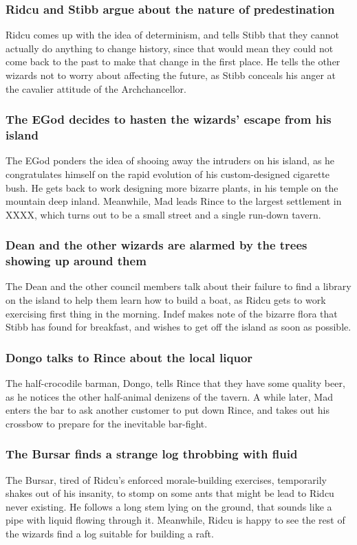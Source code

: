 \subsubsection{\Gls{Ridcu} and \Gls{Stibb} argue about the nature of predestination}
\Gls{Ridcu} comes up with the idea of determinism, and tells \Gls{Stibb} that they cannot actually
do anything to change history, since that would mean they could not come back to the past to make
that change in the first place. He tells the other wizards not to worry about affecting the future,
as \Gls{Stibb} conceals his anger at the cavalier attitude of the Archchancellor.

\subsubsection{The \Gls{EGod} decides to hasten the wizards' escape from his island}
The \Gls{EGod} ponders the idea of shooing away the intruders on his island, as he congratulates
himself on the rapid evolution of his custom-designed cigarette bush. He gets back to work
designing more bizarre plants, in his temple on the mountain deep inland. Meanwhile, \Gls{Mad} leads
\Gls{Rince} to the largest settlement in XXXX, which turns out to be a small street and a single
run-down tavern.

\subsubsection{\Gls{Dean} and the other wizards are alarmed by the trees showing up around them}
The \Gls{Dean} and the other council members talk about their failure to find a library on the
island to help them learn how to build a boat, as \Gls{Ridcu} gets to work exercising first thing
in the morning. \Gls{Indef} makes note of the bizarre flora that \Gls{Stibb} has found for
breakfast, and wishes to get off the island as soon as possible.

\subsubsection{\Gls{Dongo} talks to \Gls{Rince} about the local liquor}
The half-crocodile barman, \Gls{Dongo}, tells \Gls{Rince} that they have some quality beer, as he
notices the other half-animal denizens of the tavern. A while later, \Gls{Mad} enters the bar to
ask another customer to put down \Gls{Rince}, and takes out his crossbow to prepare for the
inevitable bar-fight.

\subsubsection{The \Gls{Bursar} finds a strange log throbbing with fluid}
The \Gls{Bursar}, tired of \Gls{Ridcu}'s enforced morale-building exercises, temporarily shakes
out of his insanity, to stomp on some ants that might be lead to \Gls{Ridcu} never existing. He
follows a long stem lying on the ground, that sounds like a pipe with liquid flowing through it.
Meanwhile, \Gls{Ridcu} is happy to see the rest of the wizards find a log suitable for building a
raft.

